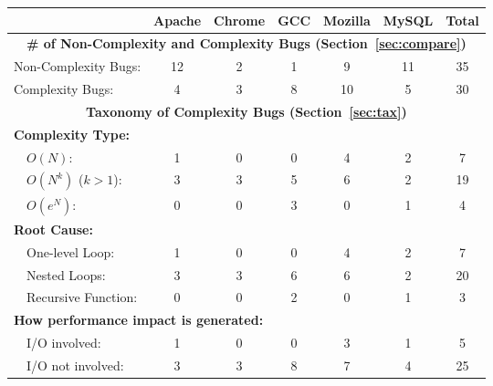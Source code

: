 
\begin{table}[tb!]
\begin{adjustwidth}{-.5in}{-.5in}
\centering
{
\scriptsize{
\begin{tabular}{|lcccccc|}
\hline
                                                                                  	&   Apache  &   Chrome   &  GCC   &    Mozilla   &   MySQL  &  Total\\
\hline
\multicolumn{7}{|c|}{\bf \# of Non-Complexity and Complexity Bugs (Section~\ref{sec:compare})}\\
\multicolumn{1}{|l}{Non-Complexity Bugs:}                                                   &   12      &    2       &   1    &    9         &  11      &   35 \\
\multicolumn{1}{|l}{Complexity Bugs:}                                                       &   4       &    3       &   8    &    10        &   5      &   30 \\
\hline \hline
\multicolumn{7}{|c|}{\bf Taxonomy of Complexity Bugs (Section~\ref{sec:tax})}\\
\hline
\multicolumn{7}{|l|}{\bf Complexity Type:} \\
\ \	{$O(N)$:}                              					&   1       &    0       &   0    &    4         &   2      &   7\\
\ \ {$O(N^k)$ ($k>1$):}                						&   3       &    3       &   5    &    6         &   2      &  19\\
\ \ {$O(e^N)$:}                       							&   0       &    0       &   3    &    0         &   1      &   4\\
\hline
\multicolumn{7}{|l|}{\bf Root Cause:} \\
\ \ {{One-level Loop:}}                 			&   1       &    0       &   0    &    4         &   2      &   7 \\
\ \ {{Nested Loops:}}                   			&   3       &    3       &   6    &    6         &   2      &   20 \\
\ \ {{Recursive Function:}}             			&   0       &    0       &   2    &    0         &   1      &   3 \\
\hline
\multicolumn{7}{|l|}{\bf How performance impact is generated:} \\
\ \ {{I/O involved:}}                 				&   1       &    0       &   0    &    3         &   1      &   5 \\
\ \ {{I/O not involved:}}                   		&   3       &    3       &   8    &    7         &   4      &   25 \\
\hline


\end{tabular}}}
\end{adjustwidth}
\end{table}
